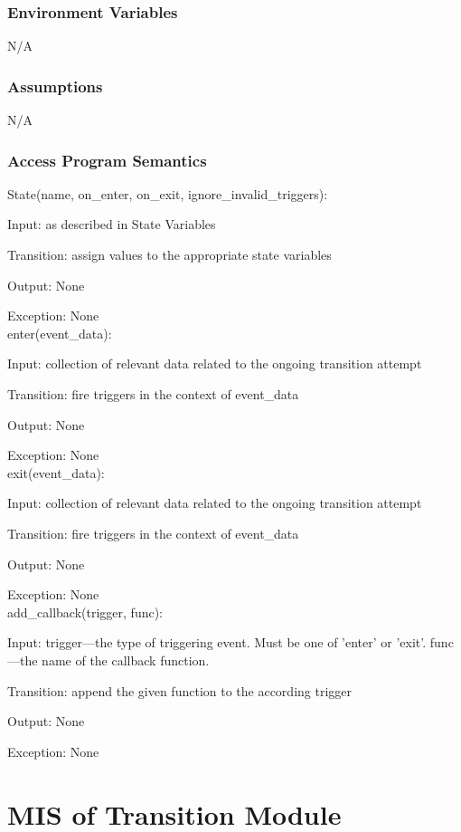 \documentclass[12pt,titlepage]{article}
\begin{document}
\subsubsection{Environment Variables}

N/A

\subsubsection{Assumptions}

N/A

\subsubsection{Access Program Semantics}

State(name, on\_enter, on\_exit, ignore\_invalid\_triggers):

Input: as described in State Variables

Transition: assign values to the appropriate state variables

Output: None

Exception: None \\
enter(event\_data):

Input: collection of relevant data related to the ongoing transition attempt

Transition: fire triggers in the context of event\_data

Output: None

Exception: None \\
exit(event\_data):

Input: collection of relevant data related to the ongoing transition attempt

Transition: fire triggers in the context of event\_data

Output: None

Exception: None \\
add\_callback(trigger, func):

Input: trigger---the type of triggering event. Must be one of 'enter' or 'exit'.
func---the name of the callback function.

Transition: append the given function to the according trigger

Output: None

Exception: None \\

\newpage
\section{MIS of Transition Module}
\end{document}
